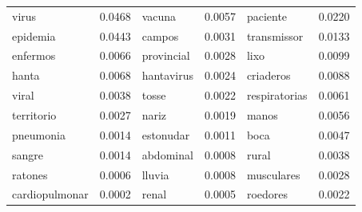 \documentclass[conference]{IEEEtran}
\begin{document}
\begin{table}[t]
\begin{center}
{\begin{tabular}{|lr|lr|lr|}
virus & 0.0468 & vacuna & 0.0057 & paciente & 0.0220 \\
epidemia & 0.0443 & campos & 0.0031 & transmissor & 0.0133 \\
enfermos & 0.0066& provincial & 0.0028  & lixo &0.0099 \\
hanta & 0.0068 & hantavirus & 0.0024  & criaderos & 0.0088\\
viral & 0.0038 & tosse & 0.0022 & respiratorias & 0.0061 \\
territorio & 0.0027 & nariz & 0.0019 & manos & 0.0056 \\
pneumonia & 0.0014 & estonudar & 0.0011 & boca & 0.0047 \\
sangre & 0.0014 & abdominal & 0.0008 & rural & 0.0038 \\
ratones & 0.0006 & lluvia & 0.0008 & musculares & 0.0028 \\
cardiopulmonar & 0.0002 & renal & 0.0005 & roedores & 0.0022 \\
\hline
\end{tabular}}
\end{center}
\label{tab:hanta_topics}
\end{table}
\end{document}
